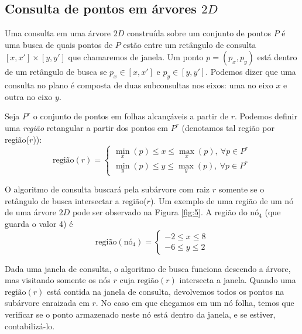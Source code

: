 \subsection{Consulta de pontos em árvores $2D$}

Uma consulta em uma árvore $2D$ construída sobre um conjunto de pontos $P$ é uma busca de quais pontos de $P$ estão entre um retângulo de consulta
\([x,x']  \times  [y,y']\) que chamaremos de janela. Um ponto $p = (p_x, p_y)$ está dentro de um retângulo de busca se $p_x \in [x, x'] \textrm{ e } p_y \in [y, y']$. Podemos dizer que uma consulta no plano é composta de duas subconsultas nos eixos: uma no eixo $x$ e outra no eixo $y$.


Seja $P^r$ o conjunto de pontos em folhas alcançáveis a partir de $r$. Podemos definir uma \emph{região} retangular a partir dos pontos em $P^r$ (denotamos tal região por região($r$)): %
$$
 \mbox{região}(r) = \begin{cases} \min_x(p) \leq x \leq \max_x(p),\ \forall p \in P^r\\ \min_y(p) \leq y \leq \max_y(p),\ \forall p \in P^r \end{cases} 
$$

O algoritmo de consulta buscará pela subárvore com raiz \(r\) somente se o retângulo de busca intersectar a região($r$). Um exemplo de uma região de um nó de uma árvore $2D$ pode ser observado na Figura \ref{fig:5}. A região do nó$_4$ (que guarda o valor 4) é
$$
\mbox{região}(\mbox{nó}_4) =  \begin{cases} -2 \leq x \leq 8 \\ -6 \leq y \leq 2 \end{cases} 
$$

Dada uma janela de consulta, o algoritmo de busca funciona descendo a árvore, mas visitando somente os nós $r$ cuja
\(\mbox{região}(r)\) intersecta a janela. Quando uma \(\mbox{região}(r)\) está contida na janela de consulta, devolvemos todos os pontos na subárvore enraizada em $r$. No caso em que chegamos em um nó folha, temos que verificar se o ponto armazenado neste nó está dentro da janela, e se estiver, contabilizá-lo.


